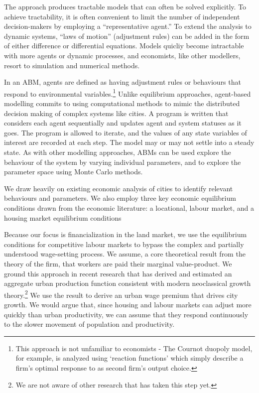 The approach produces tractable models that can often be solved explicitly. To achieve tractability, it is often convenient 
to limit the number of independent decision-makers by employing a ``representative agent.'' To extend the analysis to dynamic systems, ``laws of motion'' (adjustment rules) can be added in the form of either difference or differential equations.  Models quicliy become intractable with more agents or dynamic 
processes, and economists, like other modellers, resort to simulation 
and numerical methods. 

In an \gls{ABM}, agents are defined as having adjustment rules or behaviours that respond to environmental variables.\footnote{This approach is not unfamiliar to economists - The Cournot duopoly model, for example, is analyzed using `reaction functions' which simply describe a firm's optimal response to as second firm's output choice.} 
Unlike equilibrium approaches, agent-based modelling commits to using computational methods to mimic the distributed decision making of complex systems like cities. A program is written that considers each agent sequentially and updates agent and system statuses as it goes. The program is allowed to iterate, and the values of any state variables of interest are recorded at each step. The model may or may not settle into a steady state. As with other modelling approaches, ABMs can be used explore the behaviour of the system by varying individual parameters, and to explore the parameter space using Monte Carlo methods.


We draw heavily on existing economic analysis of cities to identify relevant behaviours and parameters. We also employ three key economic equilibrium conditions drawn from the economic literature: a locational, labour market, and a housing market equilibrium conditions

Because our focus is financialization in the land market, we use the equilibrium conditions for competitive labour markets to bypass the complex and partially understood wage-setting process. We assume, a core theoretical result from the theory of the firm, that workers are paid their \gls{marginal value-product}. We ground this approach in recent research that has derived and estimated an aggregate urban production function consistent with modern \gls{neoclassical growth theory}.\footnote{We are not aware of other research that has taken this step yet.} We use the result to derive an urban wage premium that drives city growth. We would argue that, since housing and labour markets can adjust more quickly than urban productivity, we can assume that they respond  continuously to the slower movement of population and productivity. %

